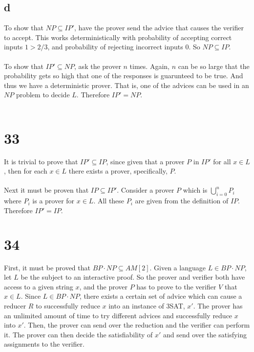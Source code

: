 \documentclass[letterpaper,notitlepage,twoside]{article}
\begin{document}
\subsection*{d}
To show that $NP \subseteq IP'$, have the prover send the advice that causes the verifier to accept. This works deterministically with probability of accepting correct inputs $1 > 2/3$, and probability of rejecting incorrect inputs $0$. So $NP \subseteq IP$. \\\\
To show that $IP' \subseteq NP$, ask the prover $n$ times. Again, $n$ can be so large that the probability gets so high that one of the responses is guarunteed to be true. And thus we have a deterministic prover. That is, one of the advices can be used in an $NP$ problem to decide $L$. Therefore $IP' = NP$. \\\\

\section*{33}
It is trivial to prove that $IP' \subseteq IP$, since given that a prover $P$ in $IP'$ for all $x \in L$, then for each $x \in L$ there exists a prover, specifically, $P$. \\\\
Next it must be proven that $IP \subseteq IP'$. Consider a prover $P$ which is $\bigcup_{i = 0}^n P_i$ where $P_i$ is a prover for $x \in L$. All these $P_i$ are given from the definition of $IP$.
Therefore $IP' = IP$.

\section*{34}
First, it must be proved that $BP \cdot NP \subseteq AM\left[2\right]$. Given a language $L \in BP \cdot NP$, let $L$ be the subject to an interactive proof. So the prover and verifier both have access to a given string $x$, and the prover $P$ has to prove to the verifier $V$ that $x \in L$. Since $L \in BP \cdot NP$, there exists a certain set of advice which can cause a reducer $R$ to successfully reduce $x$ into an instance of 3SAT, $x'$. The prover has an unlimited amount of time to try different advices and successfully reduce $x$ into $x'$. Then, the prover can send over the reduction and the verifier can perform it. The prover can then decide the satisfiability of $x'$ and send over the satisfying assignments to the verifier.
\end{document}
